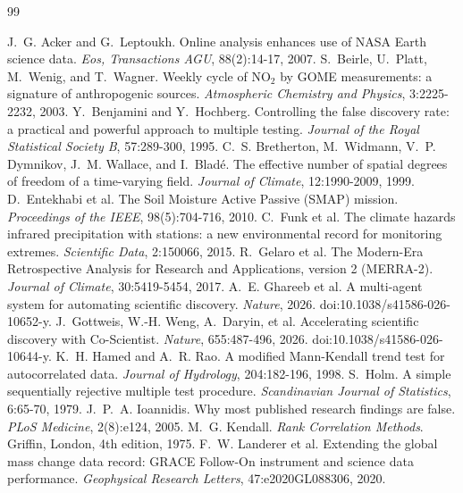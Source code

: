 \documentclass[11pt,a4paper]{article}
\begin{document}
\small
\begin{thebibliography}{99}\setlength{\itemsep}{1pt}

 J.~G. Acker and G.~Leptoukh. Online analysis enhances use of NASA Earth science data.
  \emph{Eos, Transactions AGU}, 88(2):14-17, 2007.
 S.~Beirle, U.~Platt, M.~Wenig, and T.~Wagner. Weekly cycle of NO$_2$ by GOME measurements: a
  signature of anthropogenic sources. \emph{Atmospheric Chemistry and Physics}, 3:2225-2232, 2003.
 Y.~Benjamini and Y.~Hochberg. Controlling the false discovery rate: a practical and powerful
  approach to multiple testing. \emph{Journal of the Royal Statistical Society B}, 57:289-300, 1995.
 C.~S. Bretherton, M.~Widmann, V.~P. Dymnikov, J.~M. Wallace, and I.~Blad\'e. The effective
  number of spatial degrees of freedom of a time-varying field. \emph{Journal of Climate}, 12:1990-2009, 1999.
 D.~Entekhabi et al. The Soil Moisture Active Passive (SMAP) mission. \emph{Proceedings of the
  IEEE}, 98(5):704-716, 2010.
 C.~Funk et al. The climate hazards infrared precipitation with stations: a new environmental
  record for monitoring extremes. \emph{Scientific Data}, 2:150066, 2015.
 R.~Gelaro et al. The Modern-Era Retrospective Analysis for Research and Applications, version 2
  (MERRA-2). \emph{Journal of Climate}, 30:5419-5454, 2017.
 A.~E. Ghareeb et al. A multi-agent system for automating scientific discovery. \emph{Nature},
  2026. doi:10.1038/s41586-026-10652-y.
 J.~Gottweis, W.-H. Weng, A.~Daryin, et al. Accelerating scientific discovery with Co-Scientist.
  \emph{Nature}, 655:487-496, 2026. doi:10.1038/s41586-026-10644-y.
 K.~H. Hamed and A.~R. Rao. A modified Mann-Kendall trend test for autocorrelated data.
  \emph{Journal of Hydrology}, 204:182-196, 1998.
 S.~Holm. A simple sequentially rejective multiple test procedure. \emph{Scandinavian Journal of
  Statistics}, 6:65-70, 1979.
 J.~P.~A. Ioannidis. Why most published research findings are false. \emph{PLoS Medicine},
  2(8):e124, 2005.
 M.~G. Kendall. \emph{Rank Correlation Methods}. Griffin, London, 4th edition, 1975.
 F.~W. Landerer et al. Extending the global mass change data record: GRACE Follow-On instrument
  and science data performance. \emph{Geophysical Research Letters}, 47:e2020GL088306, 2020.

\end{thebibliography}
\end{document}
